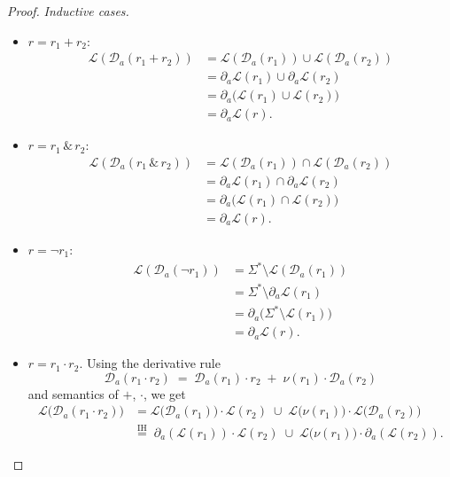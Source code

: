 \begin{proof}[Proof]
\noindent\emph{Inductive cases.}
\begin{itemize}
  \item $r=r_1+r_2$:
    \[
    \begin{aligned}
      \mathcal{L}(\mathcal{D}_a(r_1{+}r_2))
      &= \mathcal{L}(\mathcal{D}_a(r_1)) \cup \mathcal{L}(\mathcal{D}_a(r_2)) \\
      &= \partial_a \mathcal{L}(r_1) \cup \partial_a \mathcal{L}(r_2) \\
      &= \partial_a\big(\mathcal{L}(r_1)\cup \mathcal{L}(r_2)\big) \\
      &= \partial_a \mathcal{L}(r).
    \end{aligned}
    \]
  \item $r=r_1\,\&\,r_2$:
    \[
    \begin{aligned}
      \mathcal{L}(\mathcal{D}_a(r_1\,\&\,r_2))
      &= \mathcal{L}(\mathcal{D}_a(r_1)) \cap \mathcal{L}(\mathcal{D}_a(r_2)) \\
      &= \partial_a \mathcal{L}(r_1) \cap \partial_a \mathcal{L}(r_2) \\
      &= \partial_a\big(\mathcal{L}(r_1)\cap \mathcal{L}(r_2)\big) \\
      &= \partial_a \mathcal{L}(r).
    \end{aligned}
    \]
  \item $r=\neg r_1$:
    \[
    \begin{aligned}
      \mathcal{L}(\mathcal{D}_a(\neg r_1))
      &= \Sigma^* \setminus \mathcal{L}(\mathcal{D}_a(r_1)) \\
      &= \Sigma^* \setminus \partial_a \mathcal{L}(r_1) \\
      &= \partial_a\big(\Sigma^* \setminus \mathcal{L}(r_1)\big) \\
      &= \partial_a \mathcal{L}(r).
    \end{aligned}
    \]
\item $r = r_1 \cdot r_2$.
Using the derivative rule
\[
  \mathcal{D}_a(r_1\cdot r_2)
  \;=\;
  \mathcal{D}_a(r_1)\cdot r_2 \;+\; \nu(r_1)\cdot \mathcal{D}_a(r_2)
\]
and semantics of $+$, $\cdot$, we get
\[
\begin{aligned}
\mathcal{L}\big(\mathcal{D}_a(r_1\cdot r_2)\big)
&= \mathcal{L}\big(\mathcal{D}_a(r_1)\big)\cdot \mathcal{L}(r_2)
   \;\cup\;
   \mathcal{L}\big(\nu(r_1)\big)\cdot \mathcal{L}\big(\mathcal{D}_a(r_2)\big) \\[2pt]
&\stackrel{\text{IH}}{=}\;
   \partial_a(\mathcal{L}(r_1))\cdot \mathcal{L}(r_2)
   \;\cup\;
   \mathcal{L}\big(\nu(r_1)\big)\cdot \partial_a(\mathcal{L}(r_2)).

\end{aligned}\]
\end{itemize}
\end{proof}
